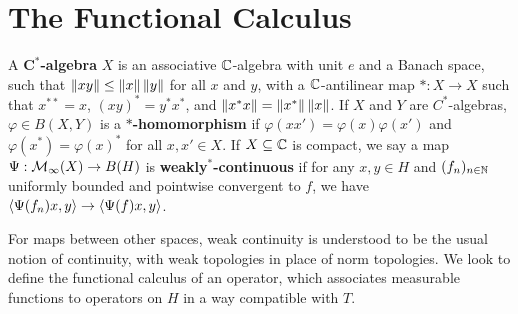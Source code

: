\documentclass[10pt]{amsart}
\begin{document}
\section{The Functional Calculus}
A \textbf{$\mathbf{C^*}$-algebra} $X$ is an associative $\mathbb{C}$-algebra with unit $e$ and a Banach space, such that $\left\| xy \right\| \leq \left\| x \right\|\left\| y \right\|$ for all $x$ and $y$, with a $\mathbb{C}$-antilinear map $* : X \to X$ such that $x^{**} = x$, $(xy)^* = y^*x^*$, and $\left\| x^*x \right\| = \left\| x^* \right\|\left\| x \right\|$. If $X$ and $Y$ are $C^*$-algebras, $\varphi \in B(X, Y)$ is a \textbf{$\mathbf{*}$-homomorphism} if $\varphi(xx') = \varphi(x)\varphi(x')$ and $\varphi(x^*) = \varphi(x)^*$ for all $x, x' \in X$. %
If $X \subseteq \mathbb{C}$ is compact, we say a map $\Psi : \mathcal{M}_\infty(X) \to B(H)$ is \textbf{weakly$^*$-continuous} if for any $x, y \in H$ and $(f_n)_{n \in \mathbb{N}}$ uniformly bounded and pointwise convergent to $f$, we have $\left\langle \Psi(f_n)x, y \right\rangle \to \left\langle \Psi(f)x, y \right\rangle$.

For maps between other spaces, weak continuity is understood to be the usual notion of continuity, with weak topologies in place of norm topologies. We look to define the functional calculus of an operator, which associates measurable functions to operators on $H$ in a way compatible with $T$. 
\end{document}
